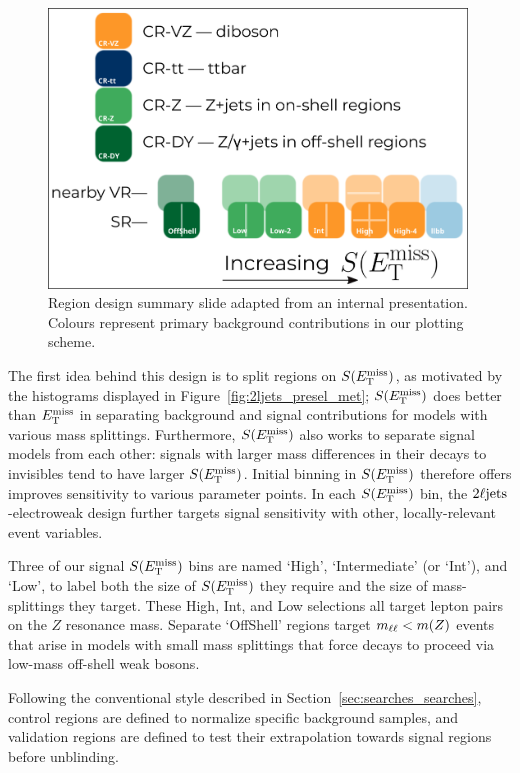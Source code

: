\begin{figure}[tp]
\centering
\includegraphics[width=0.99\textwidth]{figures/2Ljets_pam_ewkslide.png}
\caption[
Region design summary slide
]{%
Region design summary slide adapted from an internal presentation.
Colours represent primary background contributions in our plotting scheme.
}
\label{fig:2ljets_region_summary}
\end{figure}

The first idea behind this design is to split regions on $S(E_\mathrm{T}^\mathrm{miss})$, as
motivated by the histograms displayed in Figure~\ref{fig:2ljets_presel_met};
$S(E_\mathrm{T}^\mathrm{miss})$ does better than $E_\mathrm{T}^\mathrm{miss}$ in separating background and signal
contributions for models with various mass splittings.
Furthermore, $S(E_\mathrm{T}^\mathrm{miss})$ also works to separate signal models from each other:
signals with larger mass differences in their decays to invisibles tend to have
larger $S(E_\mathrm{T}^\mathrm{miss})$.
Initial binning in $S(E_\mathrm{T}^\mathrm{miss})$ therefore offers improves sensitivity to
various parameter points.
In each $S(E_\mathrm{T}^\mathrm{miss})$ bin, the $2\ell\mathrm{jets}$-electroweak design further targets
signal sensitivity with other, locally-relevant event variables.

Three of our signal $S(E_\mathrm{T}^\mathrm{miss})$ bins are named
`High',
`Intermediate' (or `Int'), and
`Low',
to label both the size of $S(E_\mathrm{T}^\mathrm{miss})$ they require and the size of
mass-splittings they target.
These High, Int, and Low selections all target lepton pairs on the $Z$
resonance mass.
Separate `OffShell' regions target $m_{\ell\ell} < m(Z)$ events that arise
in models with small mass splittings that force decays to proceed via
low-mass off-shell weak bosons.

Following the conventional style described in
Section~\ref{sec:searches_searches},
control regions are defined to normalize specific background samples,
and validation regions are defined to test their extrapolation towards
signal regions before unblinding.

